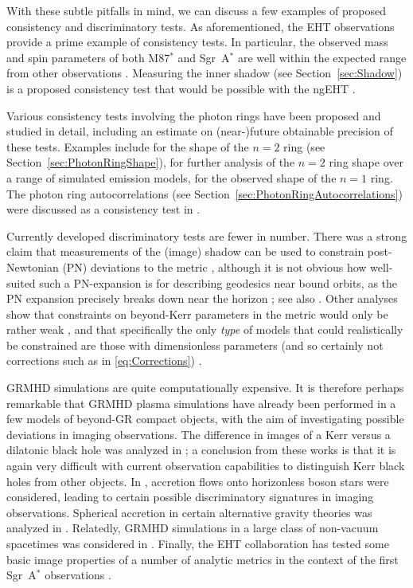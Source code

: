 \documentclass[graybox,envcountchap]{svmult}
\begin{document}
\bigskip

With these subtle pitfalls in mind, we can discuss a few examples of proposed consistency and discriminatory tests.
As aforementioned, the EHT observations provide a prime example of consistency tests.
In particular, the observed mass and spin parameters of both M87$^*$ and Sgr~A$^*$ are well within the expected range from other observations \cite{EHT2019I,EHT2022I}.
Measuring the inner shadow (see Section~\ref{sec:Shadow}) is a proposed consistency test that would be possible with the ngEHT \cite{Chael2021}.

Various consistency tests involving the photon rings have been proposed and studied in detail, including an estimate on (near-)future obtainable precision of these tests.
Examples include \cite{GLM2020} for the shape of the $n=2$ ring (see Section~\ref{sec:PhotonRingShape}), \cite{Paugnat2022} for further analysis of the $n=2$ ring shape over a range of simulated emission models, \cite{CardenasAvendano2023} for the observed shape of the $n=1$ ring.
The photon ring autocorrelations (see Section~\ref{sec:PhotonRingAutocorrelations}) were discussed as a consistency test in \cite{Hadar2021}.

\bigskip

Currently developed discriminatory tests are fewer in number.
There was a strong claim that measurements of the (image) shadow can be used to constrain post-Newtonian (PN) deviations to the metric \cite{Psaltis2020}, although it is not obvious how well-suited such a PN-expansion is for describing geodesics near bound orbits, as the PN expansion precisely breaks down near the horizon \cite{Volkel2021}; see also \cite{Gralla2019,Gralla2021}.
Other analyses show that constraints on beyond-Kerr parameters in the metric would only be rather weak \cite{Ayzenberg2022}, and that specifically the only \emph{type} of models that could realistically be constrained are those with dimensionless parameters (and so certainly not corrections such as in \eqref{eq:Corrections}) \cite{Glampedakis2021}.

GRMHD simulations are quite computationally expensive.
It is therefore perhaps remarkable that GRMHD plasma simulations have already been performed in a few models of beyond-GR compact objects, with the aim of investigating possible deviations in imaging observations.
The difference in images of a Kerr versus a dilatonic black hole was analyzed in \cite{Mizuno2018,Fromm2021,Roder2023}; a conclusion from these works is that it is again very difficult with current observation capabilities to distinguish Kerr black holes from other objects. 
In \cite{Olivares2020}, accretion flows onto horizonless boson stars were considered, leading to certain possible discriminatory signatures in imaging observations.
Spherical accretion in certain alternative gravity theories was analyzed in \cite{Bauer2022}.
Relatedly, GRMHD simulations in a large class of non-vacuum spacetimes was considered in \cite{Kocherlakota2023}.
Finally, the EHT collaboration has tested some basic image properties of a number of analytic metrics in the context of the first Sgr~A$^*$ observations \cite{EHT2022VI}.
\end{document}
